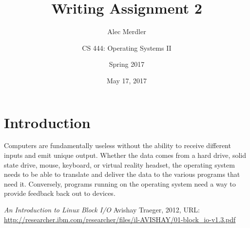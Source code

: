 \documentclass[letterpaper,draftclsnofoot,10pt,onecolumn,titlepage]{IEEEtran}\usepackage[margin=0.75in]{geometry}
\title{Writing Assignment 2}
\author{
	Alec Merdler\\
	\and
	CS 444: Operating Systems II\\
	\and
	Spring 2017\\
}
\date{May 17, 2017}
\begin{document}
\begin{titlepage}
\clearpage\maketitle
\thispagestyle{empty}

\maketitle
\end{titlepage}

\section{Introduction}
Computers are fundamentally useless without the ability to receive different inputs and emit unique output.
Whether the data comes from a hard drive, solid state drive, mouse, keyboard, or virtual reality headset,
the operating system needs to be able to translate and deliver the data to the various programs that need
it. Conversely, programs running on the operating system need a way to provide feedback back out to 
devices.


\begin{thebibliography}{1}

    \textit{An Introduction to Linux Block I/O}
    Avishay Traeger, 2012, URL: \url{http://researcher.ibm.com/researcher/files/il-AVISHAY/01-block_io-v1.3.pdf}

\end{thebibliography}
\end{document}
